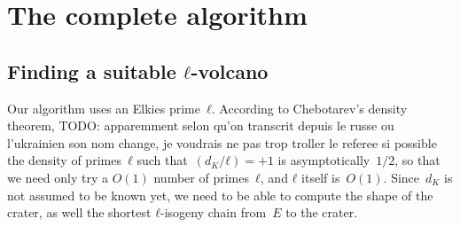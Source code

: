 \documentclass{lms}
\newcommand{\todo}[1]{{\color{red}TODO: #1}}
\begin{document}
\section{The complete algorithm}
\label{sec:complete-algorithm}
\subsection{Finding a suitable $ℓ$-volcano}
\label{sub:shape-volcano}

Our algorithm uses an Elkies prime~$ℓ$.
According to Chebotarev's density theorem,
\todo{apparemment selon qu'on transcrit depuis le russe ou l'ukrainien
son nom change, je voudrais ne pas trop troller le referee si possible}
the density of primes~$ℓ$ such that~$(d_K/ℓ) = +1$ is asymptotically~$1/2$,
so that we need only try a $O(1)$ number of primes~$ℓ$,
and $ℓ$ itself is~$O(1)$.
Since~$d_K$ is not assumed to be known yet,
we need to be able to compute the shape of the crater,
as well the shortest $ℓ$-isogeny chain from~$E$ to the crater.
\end{document}
